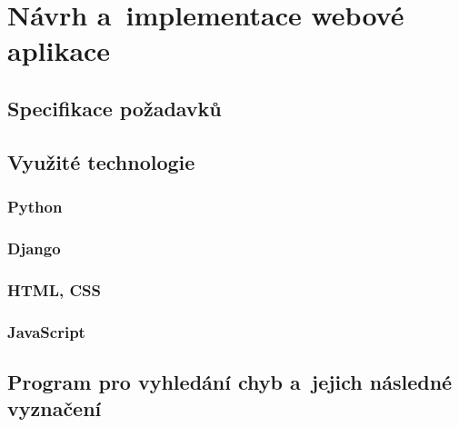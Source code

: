 \chapter{Návrh a~implementace webové aplikace}

\dummyText


\section{Specifikace požadavků}

\dummyText

\dummyText


\section{Využité technologie}

\dummyShortText[9]


\subsection*{Python}

\dummyText[2]


\subsection*{Django}

\dummyShortText[13]

\dummyText


\subsection*{HTML, CSS}

\dummyText


\subsection*{JavaScript}

\dummyText


\section{Program pro vyhledání chyb a~jejich následné vyznačení}

